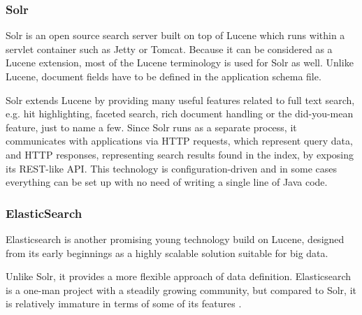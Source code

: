\subsubsection{Solr}

Solr \cite{SolrHome} is an open source search server built on top of Lucene which runs within a servlet container such as Jetty or Tomcat.
Because it can be considered as a Lucene extension, most of the Lucene terminology is used for Solr as well. 
Unlike Lucene, document fields have to be defined in the application schema file.

Solr extends Lucene by providing many useful features related to full text search, e.g. hit highlighting,
faceted search, rich document handling or the did-you-mean feature, just to name a few. 
Since Solr runs as a separate process, it communicates with applications via HTTP requests, which represent query data, and HTTP responses, representing search results found in the index, by exposing its REST-like API. 
This technology is configuration-driven and in some cases everything can be set up with no need of writing a single line of Java code. 


\subsubsection{ElasticSearch}

Elasticsearch \cite{ElasticSearchHome} is another promising young technology build on Lucene, designed from its early beginnings as a highly scalable solution suitable for big data.

Unlike Solr, it provides a more flexible approach of data definition.
Elasticsearch is a one-man project with a steadily growing community, but compared to Solr, it is relatively immature in terms of some of its features \cite{ElasticSearchComparisonSolr, ElasticSearchComparisonSolrAnother}.